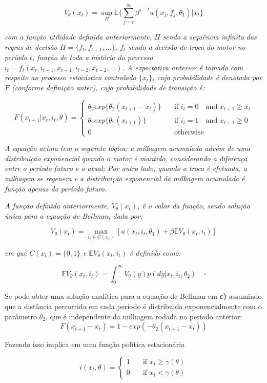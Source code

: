\documentclass[12pt,a4paper]{article}
\begin{document}
\[
V_\theta(x_t)=\sup_\Pi \mathbb{E}\Bigg\{\sum_{j=t}^\infty \beta^{j-t}u(x_j,f_j,\theta_1)|x_t\Bigg\} 
\]

\emph{com a função utilidade definida anteriormente, \(\Pi\) sendo a
sequência infinita das regras de decisão \(\Pi=\{f_t,f_{t+1},...\}\),
\(f_t\) sendo a decisão de troca do motor no período \(t\), função de
toda a história do processo
\(i_t=f_t(x_t,i_{t-1},x_{t-1},i_{t-2},x_{t-2},...)\). A expectativa
anterior é tomada com respeito ao processo estocástico controlado
\(\{x_t\}\), cuja probabilidade é denotada por \(F\) (conforme definição
anter), cuja probabilidade de transição é:}

\[
F(x_{t+1}| x_t, i_t, \theta) = 
  \begin{cases}
    \theta_2exp\{\theta_2(x_{t+1}-x_t)\}    & \quad \text{if } i_t=0  \quad \text{and } x_{t+1} \geq x_t \\
    \theta_2exp\{\theta_2(x_{t+1})\}    & \quad \text{if } i_t=1  \quad \text{and } x_{t+1} \geq 0 \\
     0 &  \quad \text{otherwise}
  \end{cases}
\]

\emph{A equação acima tem a seguinte lógica: a milhagem acumulada advém
de uma distribuição exponencial quando o motor é mantido, considerando a
diferença entre o período futuro e o atual; Por outro lado, quando a
troca é efetuada, a milhagem se regenera e a distribuição exponencial da
milhagem acumulada é função apenas do período futuro.}

\emph{A função definida anteriormente, \(V_\theta(x_t)\), é o valor da
função, sendo solução única para a equação de Bellman, dada por:}

\[
V_\theta(x_t) = \max_{i_t \in C(x_t)}[u(x_t,i_t,\theta_1)+\beta\mathbb{E}V_\theta(x_t,i_t)]
\]

\emph{em que \(C(x_t)=\{0,1\}\) e \(\mathbb{E}V_\theta(x_t,i_t)\) é
definido como:}

\[
\mathbb{E}V_\theta(x_t,i_t)=\int_0^\infty V_\theta(y)p(dy|x_t,i_t,\theta_2) \quad \square
\]

Se pode obter uma solução analítica para a equação de Bellman em
\textbf{c)} assumindo que a distância percorrida em cada período é
distribuida exponencialmente com o parâmetro \(\theta_2\), que é
independente da milhagem rodada no período anterior: \[
F(x_{t+1} - x_t) = 1 - exp(-\theta_2(x_{t+1} - x_t))
\]

Fazendo isso implica em uma função política estacionária

\[ i(x_t,\theta) = 
  \begin{cases}
    1    & \quad \text{if } x_t \ge \gamma(\theta) \\
    0    & \quad \text{if } x_t < \gamma(\theta)
  \end{cases}
\]
\end{document}
